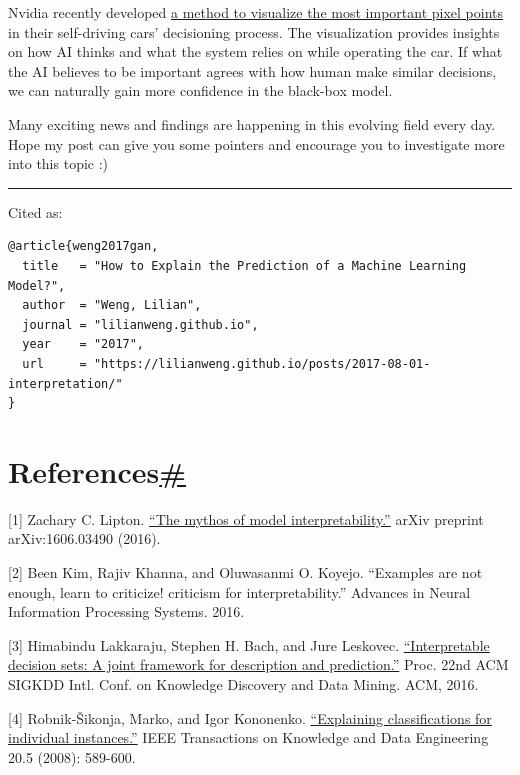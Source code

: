 Nvidia recently developed \href{https://blogs.nvidia.com/blog/2017/04/27/how-nvidias-neural-net-makes-decisions/}{a method to visualize the most important pixel points} in their self-driving cars' decisioning process. The visualization provides insights on how AI thinks and what the system relies on while operating the car. If what the AI believes to be important agrees with how human make similar decisions, we can naturally gain more confidence in the black-box model.

Many exciting news and findings are happening in this evolving field every day. Hope my post can give you some pointers and encourage you to investigate more into this topic :)

\begin{center}\rule{0.5\linewidth}{0.5pt}\end{center}

Cited as:

\begin{verbatim}
@article{weng2017gan,
  title   = "How to Explain the Prediction of a Machine Learning Model?",
  author  = "Weng, Lilian",
  journal = "lilianweng.github.io",
  year    = "2017",
  url     = "https://lilianweng.github.io/posts/2017-08-01-interpretation/"
}
\end{verbatim}

\section{\texorpdfstring{References\hyperref[references]{\#}}{References\#}}\label{references}

{[}1{]} Zachary C. Lipton. \href{https://arxiv.org/pdf/1606.03490.pdf}{``The mythos of model interpretability.''} arXiv preprint arXiv:1606.03490 (2016).

{[}2{]} Been Kim, Rajiv Khanna, and Oluwasanmi O. Koyejo. ``Examples are not enough, learn to criticize! criticism for interpretability.'' Advances in Neural Information Processing Systems. 2016.

{[}3{]} Himabindu Lakkaraju, Stephen H. Bach, and Jure Leskovec. \href{http://www.kdd.org/kdd2016/papers/files/rpp1067-lakkarajuA.pdf}{``Interpretable decision sets: A joint framework for description and prediction.''} Proc. 22nd ACM SIGKDD Intl. Conf. on Knowledge Discovery and Data Mining. ACM, 2016.

{[}4{]} Robnik-Šikonja, Marko, and Igor Kononenko. \href{http://lkm.fri.uni-lj.si/rmarko/papers/RobnikSikonjaKononenko08-TKDE.pdf}{``Explaining classifications for individual instances.''} IEEE Transactions on Knowledge and Data Engineering 20.5 (2008): 589-600.

